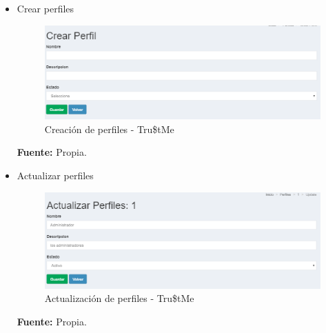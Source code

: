 {{\begin{itemize}
		\item Crear perfiles
		\begin{figure}[H]
			\centering
			\includegraphics[width=1\linewidth]{development/crearperfiles.png}
			\caption{Creación de perfiles - Tru\$tMe}
		\end{figure}
		\begin{center}
			\textbf{Fuente:} Propia.
		\end{center}
		\hfill \break
		\hfill \break
		\hfill \break
		
		\item Actualizar perfiles
		\begin{figure}[H]
			\centering
			\includegraphics[width=1\linewidth]{development/actualizarperfiles.png}
			\caption{Actualización de perfiles - Tru\$tMe}
		\end{figure}
		\begin{center}
			\textbf{Fuente:} Propia.
		\end{center}
	

\end{itemize}}}
